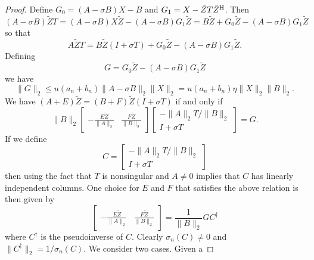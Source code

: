 \documentclass[12pt]{article}
\def\H{{\rm H}}
\begin{document}
\begin{proof}
  Define $G_0 = (A-\sigma B) X - B$ and $G_1 = X - \tilde{Z}T\tilde{Z}^\H$.  Then
  \begin{equation*}
    (A-\sigma B) \tilde{Z} T 
    = (A-\sigma B) X \tilde{Z} - (A-\sigma B) G_1 \tilde{Z}
    = B\tilde{Z} + G_0\tilde{Z} - (A-\sigma B) G_1 \tilde{Z}
  \end{equation*}
  so that
  \begin{equation*}
    A \tilde{Z} T= B \tilde{Z} (I+\sigma T) + G_0 \tilde{Z} - (A-\sigma B)G_1 \tilde{Z}.
  \end{equation*}
  Defining
  \begin{equation*}
    G = G_0 \tilde{Z} - (A-\sigma B)G_1 \tilde{Z}
  \end{equation*}
  we have
  \begin{equation*}
    \|G\|_2
    \leq u (a_n + b_n) \|A-\sigma B\|_2 \|X\|_2
    = u (a_n + b_n) \eta \|X\|_2 \|B\|_2.
  \end{equation*}
  We have $(A+E)\tilde{Z} = (B+F)\tilde{Z}(I+\sigma T)$ if and only if
  \begin{equation*}
    \|B\|_2 \begin{bmatrix}
      -\frac{E\tilde{Z}}{\|A\|_2} & \frac{F\tilde{Z}}{\|B\|_2}
    \end{bmatrix}
    \begin{bmatrix}
      -\|A\|_2 T / \|B\|_2 \\ I + \sigma T
    \end{bmatrix}
    = G.
  \end{equation*}
  If we define
  \begin{equation*}
    C
    =
    \begin{bmatrix}
      -\|A\|_2 T / \|B\|_2 \\ I + \sigma T
    \end{bmatrix}
  \end{equation*}
  then using the fact that $T$ is nonsingular and $A \neq 0$ implies
  that $C$ has linearly independent columns.  One choice for $E$ and
  $F$ that satisfies the above relation is then given by
  \begin{equation*}
    \begin{bmatrix}
      -\frac{E\tilde{Z}}{\|A\|_2} & \frac{F\tilde{Z}}{\|B\|_2}
    \end{bmatrix} = \frac{1}{\|B\|_2} G C^{\dagger}
  \end{equation*}
  where $C^{\dagger}$ is the pseudoinverse of $C$.  Clearly $\sigma_n(C)\neq 0$ and
  $\|C^\dagger\|_2 = 1/\sigma_n(C)$.  We consider two cases.  Given a

\end{proof}
\end{document}
